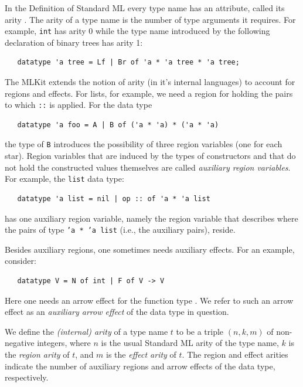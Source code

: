 \documentclass[12pt]{book}
\begin{document}
In the Definition of Standard ML every type name has an attribute,
called its arity \cite[page 15]{mthm97}. The arity of a type name is the number
of type arguments it requires. For example, {\tt int} has arity 0
while the type name introduced by the following declaration of binary
trees has arity 1:
%
%
%
%
\begin{verbatim}
   datatype 'a tree = Lf | Br of 'a * 'a tree * 'a tree;
\end{verbatim}

The MLKit extends the notion of arity (in it's internal languages) to
account for regions and effects. For lists, for example, we need a
region for holding the pairs to which {\tt ::} is applied. For the
data type
\begin{verbatim}
   datatype 'a foo = A | B of ('a * 'a) * ('a * 'a)
\end{verbatim}
the type of {\tt B} introduces the possibility of three region
variables (one for each star). Region variables that are induced by
the types of constructors and that do not hold the constructed values
themselves are called
%
{\em auxiliary region variables}. For example, the {\tt list} data
type:
\begin{verbatim}
   datatype 'a list = nil | op :: of 'a * 'a list
\end{verbatim}
has one auxiliary region variable, namely the region variable that
describes where the pairs of type {\tt 'a * 'a list} (i.e., the
auxiliary
%
pairs), reside.

Besides auxiliary regions, one sometimes needs auxiliary effects.  For
an example, consider:
\begin{verbatim}
   datatype V = N of int | F of V -> V
\end{verbatim}
Here one needs an arrow effect for the function type .
We refer to such an arrow effect as an
%
{\em auxiliary arrow effect} of the data type in question.


We define the {\em (internal) arity} of a type name $t$ to be a triple
$(n,k,m)$ of non-negative integers, where $n$ is the usual Standard ML
arity of the type name, $k$ is the
%
{\em region arity} of $t$, and $m$ is the 
%
{\em effect arity} of $t$. The region and effect arities indicate the
number of auxiliary regions and arrow effects of the data type,
respectively.
\end{document}
